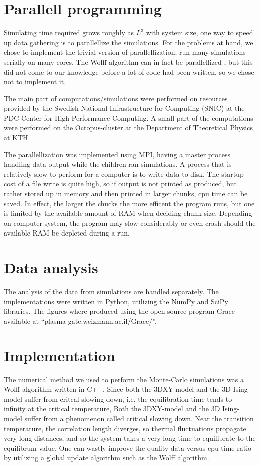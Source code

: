 \section{Parallell programming}
Simulating time required grows roughly as $L^3$ with system size, one way to speed up data gathering is to parallellize the simulations.
For the problems at hand, we chose to implement the trivial version of parallellization; run many simulations serially on many cores.
The Wolff algorithm can in fact be parallellized \cite{Kaupuzs2010}, but this did not come to our knowledge before a lot of code had been written, so we chose not to implement it. 

The main part of computations/simulations were performed on resources provided by the Swedish National Infrastructure for Computing (SNIC) at the PDC Center for High Performance Computing.
A small part of the computations were performed on the Octopus-cluster at the Department of Theoretical Physics at KTH.

The parallellization was implemented using MPI, having a master process handling data output while the children ran simulations.
A process that is relatively slow to perform for a computer is to write data to disk. 
The startup cost of a file write is quite high, so if output is not printed as produced, but rather stored up in memory and then printed in larger chunks, cpu time can be saved. 
In effect, the larger the chucks the more efficent the program runs, but one is limited by the available amount of RAM when deciding chunk size.
Depending on computer system, the program may slow considerably or even crash should the available RAM be depleted during a run.
\section{Data analysis}
The analysis of the data from simulations are handled separately.
The implementations were written in Python, utilizing the NumPy and SciPy libraries. 
The figures where produced using the open source program Grace available at ``plasma-gate.weizmann.ac.il/Grace/''.

\section{Implementation}
The numerical method we used to perform the Monte-Carlo simulations was a Wolff algorithm written in C++. Since both the 3DXY-model and the 3D Ising model suffer from critcal slowing down, i.e. the equilibration time tends to infinity at the critical temperature, 
Both the 3DXY-model and the 3D Ising-model suffer from a phenomenon called critical slowing down. Near the transition temperature, the correlation length diverges, so thermal fluctuations propagate very long distances, and so the system takes a very long time to equilibrate to the equilibrum value.
One can wastly improve the quality-data versus cpu-time ratio by utilizing a global update algorithm such as the Wolff algorithm. 
